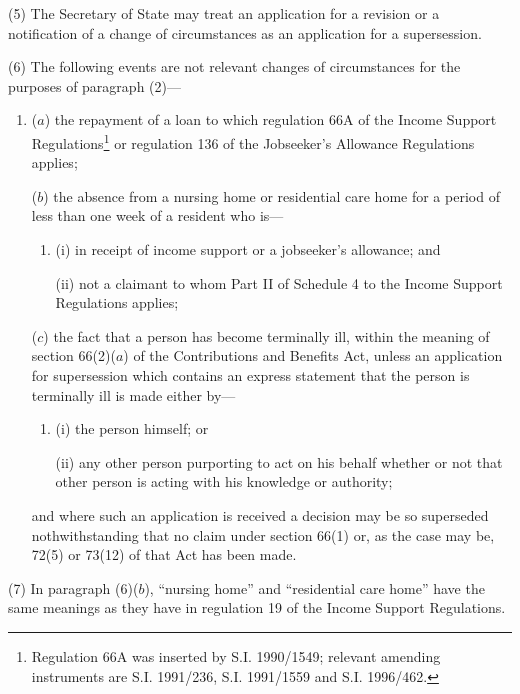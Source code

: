 \documentclass[12pt,a4paper]{article}
\begin{document}
(5) The Secretary of State may treat an application for a revision or a notification of a change of circumstances as an application for a supersession.

(6) The following events are not relevant changes of circumstances for the purposes of paragraph (2)—
\begin{enumerate}\item[]
($a$) the repayment of a loan to which regulation 66A of the Income Support Regulations\footnote{\frenchspacing Regulation 66A was inserted by S.I. 1990/1549; relevant amending instruments are S.I. 1991/236, S.I. 1991/1559 and S.I. 1996/462.} or regulation 136 of the Jobseeker’s Allowance Regulations applies;

($b$) the absence from a nursing home or residential care home for a period of less than one week of a resident who is—
\begin{enumerate}\item[]
(i) in receipt of income support or a jobseeker’s allowance; and

(ii) not a claimant to whom Part II of Schedule 4 to the Income Support Regulations applies;
\end{enumerate}

($c$) the fact that a person has become terminally ill, within the meaning of section 66(2)($a$) of the Contributions and Benefits Act, unless an application for supersession which contains an express statement that the person is terminally ill is made either by—
\begin{enumerate}\item[]
(i) the person himself; or

(ii) any other person purporting to act on his behalf whether or not that other person is acting with his knowledge or authority;
\end{enumerate}
and where such an application is received a decision may be so superseded nothwithstanding that no claim under section 66(1) or, as the case may be, 72(5) or 73(12) of that Act has been made.
\end{enumerate}

(7) In paragraph (6)($b$), “nursing home” and “residential care home” have the same meanings as they have in regulation 19 of the Income Support Regulations.

\end{document}
